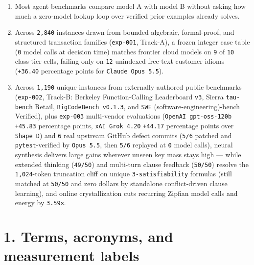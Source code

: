 \documentclass[10pt,letterpaper]{article}
\providecommand{\tightlist}{\setlength{\itemsep}{1pt}\setlength{\parskip}{0pt}}
\begin{document}
\begin{enumerate}
\def\labelenumi{\arabic{enumi}.}
\tightlist
\item
  Most agent benchmarks compare model A with model B without asking how
  much a zero-model lookup loop over verified prior examples already
  solves.
\item
  Across \texttt{2,840} instances drawn from bounded algebraic,
  formal-proof, and structured transaction families (\texttt{exp-001},
  Track-A), a frozen integer case table (\texttt{0} model calls at
  decision time) matches frontier cloud models on \texttt{9} of
  \texttt{10} class-tier cells, failing only on \texttt{12} unindexed
  free-text customer idioms (\texttt{+36.40} percentage points for
  \texttt{Claude\ Opus\ 5.\allowbreak{}5}).
\item
  Across \texttt{1,190} unique instances from externally authored public
  benchmarks (\texttt{exp-002}, Track-B: Berkeley Function-Calling
  Leaderboard \texttt{v3}, Sierra \texttt{tau-bench} Retail,
  \texttt{BigCodeBench\ v0.\allowbreak{}1.\allowbreak{}3}, and \texttt{SWE}
  (software-engineering)-bench Verified), plus \texttt{exp-003}
  multi-vendor evaluations (\texttt{OpenAI\ gpt-\allowbreak{}oss-\allowbreak{}120b}
  \texttt{+45.83} percentage points, \texttt{xAI\ Grok\ 4.\allowbreak{}20}
  \texttt{+44.17} percentage points over \texttt{Shape\ D}) and
  \texttt{6} real upstream GitHub defect commits (\texttt{5/6} patched
  and \texttt{pytest}-verified by \texttt{Opus\ 5.5}, then \texttt{5/6}
  replayed at \texttt{0} model calls), neural synthesis delivers large
  gains wherever unseen key mass stays high --- while extended thinking
  (\texttt{49/50}) and multi-turn clause feedback (\texttt{50/50})
  resolve the \texttt{1,024}-token truncation cliff on unique
  \texttt{3-\allowbreak{}satisfiability} formulas (still matched at \texttt{50/50}
  and zero dollars by standalone conflict-driven clause learning), and
  online crystallization cuts recurring Zipfian model calls and energy
  by \texttt{3.59×}.
\end{enumerate}

\section{1. Terms, acronyms, and measurement
labels}\label{terms-acronyms-and-measurement-labels}
\end{document}
